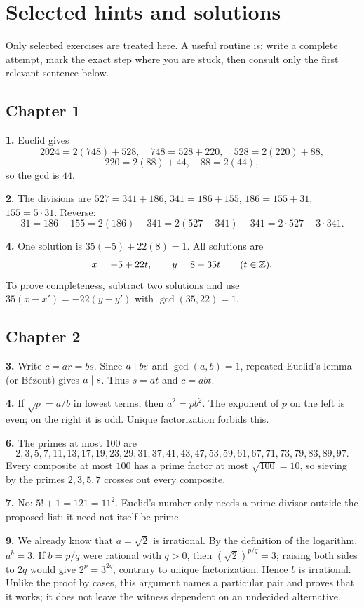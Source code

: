 \chapter{Selected hints and solutions}

Only selected exercises are treated here. A useful routine is: write a complete attempt, mark the exact step where you are stuck, then consult only the first relevant sentence below.

\section*{Chapter 1}

\textbf{1.} Euclid gives
\[
2024=2(748)+528,\quad748=528+220,\quad528=2(220)+88,
\]
\[
220=2(88)+44,\quad88=2(44),
\]
so the gcd is $44$.

\textbf{2.} The divisions are $527=341+186$, $341=186+155$, $186=155+31$, $155=5\cdot31$. Reverse:
\[
31=186-155=2(186)-341=2(527-341)-341=2\cdot527-3\cdot341.
\]

\textbf{4.} One solution is $35(-5)+22(8)=1$. All solutions are
\[
x=-5+22t,\qquad y=8-35t\qquad(t\in\mathbb Z).
\]
To prove completeness, subtract two solutions and use $35(x-x')=-22(y-y')$ with $\gcd(35,22)=1$.

\section*{Chapter 2}

\textbf{3.} Write $c=ar=bs$. Since $a\mid bs$ and $\gcd(a,b)=1$, repeated Euclid's lemma (or B\'ezout) gives $a\mid s$. Thus $s=at$ and $c=abt$.

\textbf{4.} If $\sqrt p=a/b$ in lowest terms, then $a^2=pb^2$. The exponent of $p$ on the left is even; on the right it is odd. Unique factorization forbids this.

\textbf{6.} The primes at most $100$ are
\[
2,3,5,7,11,13,17,19,23,29,31,37,41,43,47,53,59,61,67,71,73,79,83,89,97.
\]
Every composite at most $100$ has a prime factor at most $\sqrt{100}=10$, so
sieving by the primes $2,3,5,7$ crosses out every composite.

\textbf{7.} No: $5!+1=121=11^2$. Euclid's number only needs a prime divisor outside the proposed list; it need not itself be prime.

\textbf{9.} We already know that $a=\sqrt2$ is irrational. By the definition
of the logarithm, $a^b=3$. If $b=p/q$ were rational with $q>0$, then
$(\sqrt2)^{p/q}=3$; raising both sides to $2q$ would give
$2^p=3^{2q}$, contrary to unique factorization. Hence $b$ is irrational.
Unlike the proof by cases, this argument names a particular pair and proves
that it works; it does not leave the witness dependent on an undecided
alternative.

